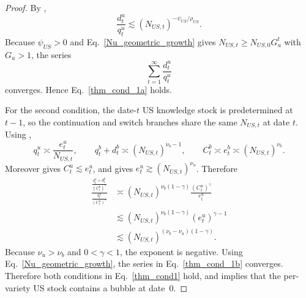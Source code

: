 \documentclass{article}
\begin{document}
\begin{proof}
By ,
\[
\frac{d_t^u}{q_t^u}\lesssim (N_{US,t})^{-\psi_{US}/\rho_{US}}.
\]
Because $\psi_{US}>0$ and Eq.~\eqref{Nu_geometric_growth} gives $N_{US,t}\ge N_{US,0}G_u^t$ with $G_u>1$, the series
\[
\sum_{t=1}^{\infty}\frac{d_t^u}{q_t^u}
\]
converges. Hence Eq.~\eqref{thm_cond_1a} holds.

For the second condition, the date-$t$ US knowledge stock is predetermined at $t-1$, so the continuation and switch branches share the same $N_{US,t}$ at date $t$. Using ,
\[
q_t^u\asymp \frac{e_t^u}{N_{US,t}},
\qquad
q_t^b+d_t^b\asymp (N_{US,t})^{\nu_b-1},
\qquad
C_t^b\asymp e_t^b\asymp (N_{US,t})^{\nu_b}.
\]
Moreover  gives $C_t^u\lesssim e_t^u$, and  gives $e_t^u\gtrsim (N_{US,t})^{\nu_u}$. Therefore
\begin{align*}
\frac{\frac{q_t^b+d_t^b}{(C_t^b)^\gamma}}{\frac{q_t^u}{(C_t^u)^\gamma}}
&\asymp
(N_{US,t})^{\nu_b(1-\gamma)}\frac{(C_t^u)^\gamma}{e_t^u}\\
&\lesssim
(N_{US,t})^{\nu_b(1-\gamma)}(e_t^u)^{\gamma-1}\\
&\lesssim
(N_{US,t})^{(\nu_b-\nu_u)(1-\gamma)}.
\end{align*}
Because $\nu_u>\nu_b$ and $0<\gamma<1$, the exponent is negative. Using Eq.~\eqref{Nu_geometric_growth}, the series in Eq.~\eqref{thm_cond_1b} converges. Therefore both conditions in Eq.~\eqref{thm_cond1} hold, and  implies that the per-variety US stock contains a bubble at date~0.
\end{proof}
\end{document}
